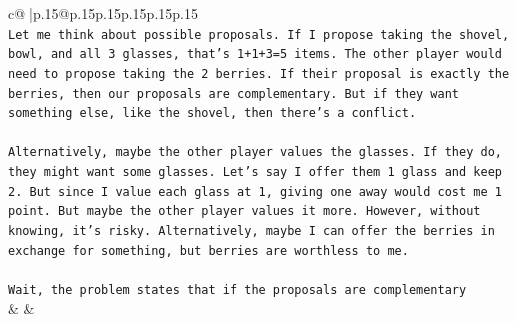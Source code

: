 \documentclass{article}
\begin{document}
{\begin{supertabular}{c@{$\;$}|p{.15\linewidth}@{}p{.15\linewidth}p{.15\linewidth}p{.15\linewidth}p{.15\linewidth}p{.15\linewidth}}
{{{\\ 
\texttt{Let me think about possible proposals. If I propose taking the shovel, bowl, and all 3 glasses, that's 1+1+3=5 items. The other player would need to propose taking the 2 berries. If their proposal is exactly the berries, then our proposals are complementary. But if they want something else, like the shovel, then there's a conflict.} \\
\\ 
\texttt{Alternatively, maybe the other player values the glasses. If they do, they might want some glasses. Let's say I offer them 1 glass and keep 2. But since I value each glass at 1, giving one away would cost me 1 point. But maybe the other player values it more. However, without knowing, it's risky. Alternatively, maybe I can offer the berries in exchange for something, but berries are worthless to me.} \\
\\ 
\texttt{Wait, the problem states that if the proposals are complementary} \\
            }
        }
    }
    & & \\ \\


\end{supertabular}}
\end{document}
